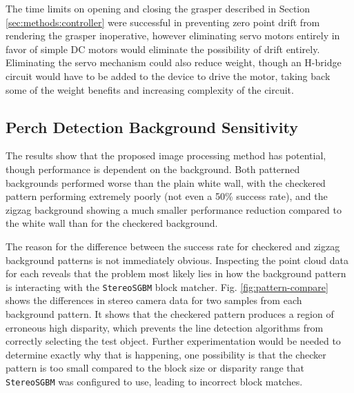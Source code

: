 The time limits on opening and closing the grasper described in Section \ref{sec:methods:controller}
were successful in preventing zero point drift from rendering the grasper inoperative, however eliminating
servo motors entirely in favor of simple DC motors would eliminate the possibility of drift entirely. 
Eliminating the servo mechanism could also reduce weight, though an H-bridge circuit would have to 
be added to the device to drive the motor, taking back some of the weight benefits and increasing complexity 
of the circuit. 


\subsection{Perch Detection Background Sensitivity}


The results show that the proposed image processing method has potential, though performance is dependent on the background.
Both patterned backgrounds performed worse than the plain white wall, with the checkered pattern performing extremely poorly (not
even a 50\% success rate), and the zigzag background showing a much smaller performance reduction compared to the white wall than 
for the checkered background.

The reason for the difference between the success rate for checkered and zigzag background patterns is not immediately obvious. 
Inspecting the point cloud data for each reveals that the problem most likely lies in how the background pattern is interacting 
with the \texttt{StereoSGBM} block matcher. Fig. \ref{fig:pattern-compare} shows the differences in stereo camera data for two samples
from each background pattern. It shows that the checkered pattern produces a region of erroneous high disparity, which prevents the 
line detection algorithms from correctly selecting the test object. Further experimentation would be needed to determine exactly 
why that is happening, one possibility is that the checker pattern is too small compared to the block size or disparity range
that \texttt{StereoSGBM} was configured to use, leading to incorrect block matches.

